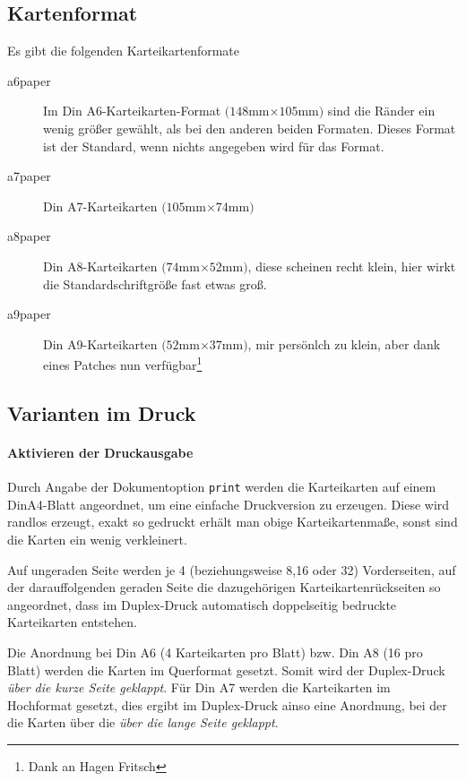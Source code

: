 \documentclass[a4paper,DIV=calc]{scrartcl}
\begin{document}
\subsection{Kartenformat}
Es gibt die folgenden Karteikartenformate
\begin{description}
	\item[{\sffamily a6paper}] Im Din A6-Karteikarten-Format $(148$mm$\times 105$mm$)$ sind die Ränder ein wenig größer gewählt, als bei den anderen beiden Formaten. Dieses Format ist der Standard, wenn nichts angegeben wird für das Format.
	\item[{\sffamily a7paper}] Din A7-Karteikarten $(105$mm$\times 74$mm$)$
	\item[{\sffamily a8paper}] Din A8-Karteikarten $(74$mm$\times 52$mm$)$, diese scheinen recht klein, hier wirkt die Standardschriftgröße fast etwas groß.
	\item[{\sffamily a9paper}] Din A9-Karteikarten $(52$mm$\times 37$mm$)$, mir persönlch zu klein, aber dank eines Patches nun verfügbar\footnote{Dank an Hagen Fritsch}
\end{description}
\subsection{Varianten im Druck}
\paragraph{Aktivieren der Druckausgabe}
Durch Angabe der Dokumentoption \lstinline!print! werden die Karteikarten auf einem DinA4-Blatt angeordnet, um eine einfache Druckversion zu erzeugen. Diese wird randlos erzeugt, exakt so gedruckt erhält man obige Karteikartenmaße, sonst sind die Karten ein wenig verkleinert.

Auf ungeraden Seite werden je 4 (beziehungsweise 8,16 oder 32) Vorderseiten, auf der darauffolgenden geraden Seite die dazugehörigen Karteikartenrückseiten so angeordnet, dass im Duplex-Druck automatisch doppelseitig bedruckte Karteikarten entstehen.

Die Anordnung bei Din A6 (4 Karteikarten pro Blatt) bzw. Din A8 (16 pro Blatt) werden die Karten im Querformat gesetzt. Somit wird der Duplex-Druck  \emph{über die kurze Seite geklappt}. Für Din A7 werden die Karteikarten im Hochformat gesetzt, dies ergibt im Duplex-Druck ainso eine Anordnung, bei der die Karten über die \emph{über die lange Seite geklappt}.
\end{document}
